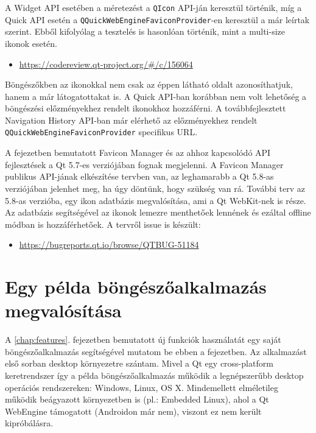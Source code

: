 \documentclass[12pt]{report}
\let\origurl\url
\renewcommand{\url}[1]{%
    \textcolor{blue}{\origurl{#1}}
}
\newcommand{\gerrit}[1]{%
    \textcolor{qtgreen}{\origurl{https://codereview.qt-project.org/\#/c/#1}}
}
\newcommand{\qtbug}[1]{%
    \textcolor{qtred}{\origurl{https://bugreports.qt.io/browse/QTBUG-#1}}
}
\begin{document}
A Widget API esetében a méretezést a \texttt{QIcon} API-ján keresztül történik, míg a
Quick API esetén a \texttt{QQuickWebEngineFaviconProvider}-en keresztül a már leírtak
szerint. Ebből kifolyólag a tesztelés is hasonlóan történik, mint a multi-size ikonok
esetén.

\begin{center}
    \begin{reviewbox}
        \begin{itemize}
            \renewcommand{\labelitemi}{\textcolor{qtgreen}{$\blacktriangleright$}}
            \item \gerrit{156064}
        \end{itemize}
    \end{reviewbox}
\end{center}

Böngészőkben az ikonokkal nem csak az éppen látható oldalt azonosíthatjuk, hanem a már
látogatottakat is. A Quick API-ban korábban nem volt lehetőség a böngészési előzményekhez
rendelt ikonokhoz hozzáférni. A továbbfejlesztett Navigation History API-ban már elérhető
az előzményekhez rendelt \texttt{QQuickWebEngineFaviconProvider} specifikus URL.

A fejezetben bemutatott Favicon Manager és az ahhoz kapcsolódó API fejlesztések a Qt 5.7-es
verziójában fognak megjelenni. A Favicon Manager publikus API-jának elkészítése tervben van,
az leghamarabb a Qt 5.8-as verziójában jelenhet meg, ha úgy döntünk, hogy szükség van rá.
További terv az 5.8-as verzióba, egy ikon adatbázis megvalósítása, ami a Qt WebKit-nek is
része. Az adatbázis segítségével az ikonok lemezre menthetőek lennének és ezáltal offline
módban is hozzáférhetőek. A tervről issue is készült:
\begin{center}
    \begin{issuebox}
        \begin{itemize}
            \renewcommand{\labelitemi}{\textcolor{qtred}{$\blacktriangleright$}}
            \item \qtbug{51184}
        \end{itemize}
    \end{issuebox}
\end{center}


\chapter{Egy példa böngészőalkalmazás megvalósítása}

A \ref{chap:features}. fejezetben bemutatott új funkciók használatát egy saját
böngészőalkalmazás segítségével mutatom be ebben a fejezetben. Az alkalmazást első sorban
desktop környezetre szántam. Mivel a Qt egy cross-platform keretrendszer így a példa
böngészőalkalmazás működik a legnépszerűbb desktop operációs rendszereken: Windows, Linux,
OS X. Mindemellett elméletileg működik beágyazott környezetben is (pl.: Embedded Linux),
ahol a Qt WebEngine támogatott (Androidon már nem), viszont ez nem került kipróbálásra.
\end{document}
